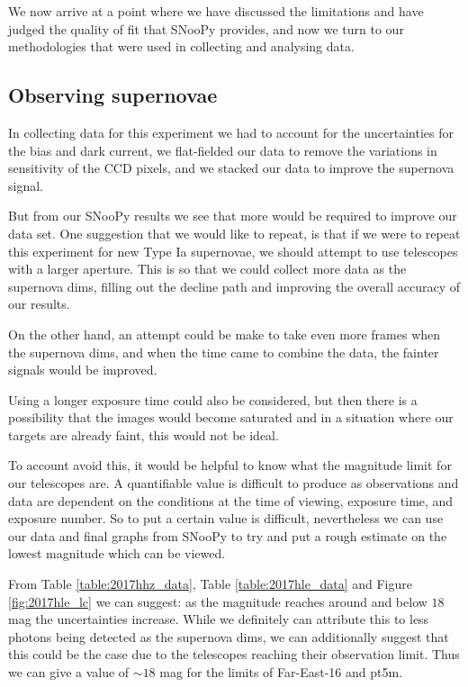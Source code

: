 \documentclass[twocolumn]{revtex4}
\begin{document}
We now arrive at a point where we have discussed the limitations and have judged the quality of fit that SNooPy provides, and now we turn to our methodologies that were used in collecting and analysing data.

\vspace{-3ex}
\subsection{Observing supernovae}
\vspace{-2ex}

In collecting data for this experiment we had to account for the uncertainties for the bias and dark current, we flat-fielded our data to remove the variations in sensitivity of the CCD pixels, and we stacked our data to improve the supernova signal. 

But from our SNooPy results we see that more would be required to improve our data set. One suggestion that we would like to repeat, is that if we were to repeat this experiment for new Type Ia supernovae, we should attempt to use telescopes with a larger aperture. This is so that we could collect more data as the supernova dims, filling out the decline path and improving the overall accuracy of our results.

On the other hand, an attempt could be make to take even more frames when the supernova dims, and when the time came to combine the data, the fainter signals would be improved.

Using a longer exposure time could also be considered, but then there is a possibility that the images would become saturated and in a situation where our targets are already faint, this would not be ideal.

To account avoid this, it would be helpful to know what the magnitude limit for our telescopes are. A quantifiable value is difficult to produce as observations and data are dependent on the conditions at the time of viewing, exposure time, and exposure number. So to put a certain value is difficult, nevertheless we can use our data and final graphs from SNooPy to try and put a rough estimate on the lowest magnitude which can be viewed.

From Table \ref{table:2017hhz_data}, Table \ref{table:2017hle_data} and Figure \ref{fig:2017hle_lc} we can suggest: as the magnitude reaches around and below $18$ mag the uncertainties increase. While we definitely can attribute this to less photons being detected as the supernova dims, we can additionally suggest that this could be the case due to the telescopes reaching their observation limit. Thus we can give a value of $\sim 18$ mag for the limits of Far-East-16 and pt5m.
\end{document}
